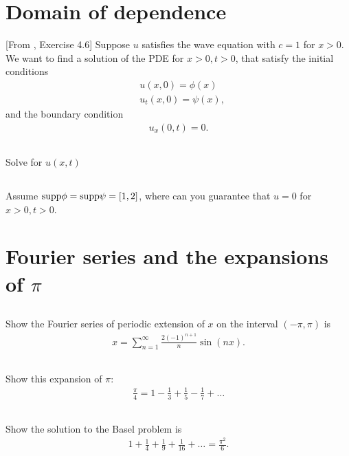 \documentclass[11pt,letterpaper]{article}
\begin{document}
\section{Domain of dependence}
[From \cite{ShearerLevy_15}, Exercise 4.6] Suppose $u$ satisfies the wave equation with $c=1$ for $x>0$. We want to find a solution of the PDE for $x>0, t>0$, that satisfy the initial conditions
\begin{align}
    & u(x,0) = \phi(x)\\
    & u_t(x,0) = \psi(x),
\end{align}
and the boundary condition
\begin{align}
    u_x(0,t) = 0.
\end{align}

\subsection{}
Solve for $u(x,t)$

\subsection{}
Assume $\text{supp}\phi = \text{supp}\psi=[1,2]$, where can you guarantee that $u=0$ for $x>0, t>0$. 

\section{Fourier series and the expansions of $\pi$}
\subsection{}
Show the Fourier series of periodic extension of $x$ on the interval $(-\pi,\pi)$ is
\begin{align}
    x = \sum_{n=1}^\infty \frac{2(-1)^{n+1}}{n}\sin(nx).
\end{align}

\subsection{}
Show this expansion of $\pi$:
\begin{align}
    \frac{\pi}{4} = 1-\frac{1}{3}+\frac{1}{5}-\frac{1}{7}+\dots
\end{align}

\subsection{}
Show the solution to the Basel problem is
\begin{align}
    1+\frac{1}{4}+\frac{1}{9}+\frac{1}{16} + \dots = \frac{\pi^2}{6}.
\end{align}
\end{document}
